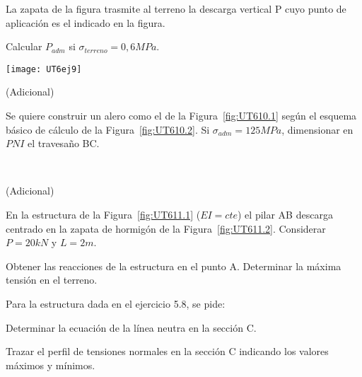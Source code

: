 \ejercicio 

La zapata de la figura trasmite al terreno la descarga vertical P cuyo punto de aplicación es el indicado en la figura.

Calcular $P_{adm}$ si $\sigma_{terreno}=0,6MPa$.

\begin{center}
\texttt{[image: UT6ej9]}
\end{center}

\ejercicio (Adicional)

Se quiere construir un alero como el de la Figura~\ref{fig:UT610.1} según el esquema básico de cálculo de la Figura~\ref{fig:UT610.2}. Si $\sigma_{adm}=125MPa$, dimensionar en $PNI$ el travesaño BC.

\begin{figure}[htb]
	\centering
\subfloat[Alero]{
\texttt{[image: UT6ej10-1]}
	\label{fig:UT610.1}}
~
\caption{}
	\label{fig:UT610}
\end{figure}

\ejercicio (Adicional)

En la estructura de la Figura~\ref{fig:UT611.1} ($EI=cte$) el pilar AB descarga centrado en la zapata de hormigón de la Figura~\ref{fig:UT611.2}. Considerar $P=20kN$ y $L=2m$.

\begin{figure}[htb]
	\centering
{}
\hspace{0.1\textwidth}
\subfloat[Zapata]{
\texttt{[image: UT6ej11-2]}
	\label{fig:UT611.2}}
\caption{}
	\label{fig:UT611}
\end{figure}

\parte Obtener las reacciones de la estructura en el punto A.
\parte Determinar la máxima tensión en el terreno.



\ejercicio

Para la estructura dada en el ejercicio 5.8, se pide:

\parte Determinar la ecuación de la línea neutra en la sección C.

\parte Trazar el perfil de tensiones normales en la sección C indicando los valores máximos y mínimos.
